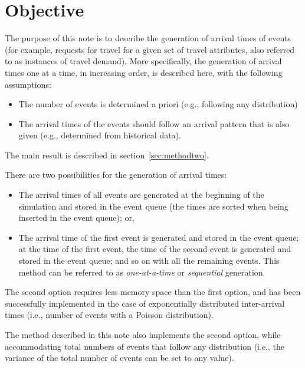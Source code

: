 \documentclass[12pt]{article} %
\begin{document}
\section{Objective}
%
The purpose of this note is to describe the generation of arrival times of events (for example, requests for travel for a given set of travel attributes, also referred to as instances of travel demand). More specifically, the generation of arrival times one at a time, in increasing order, is described here, with the following assumptions:
\begin{itemize}
\item The number of events is determined a priori (e.g., following any distribution)
\item The arrival times of the events should follow an arrival pattern that is also given (e.g., determined from historical data).
\end{itemize}
The main result is described in section~\ref{sec:methodtwo}.\par
There are two possibilities for the generation of arrival times:
\begin{itemize}
\item The arrival times of all events are generated at the beginning of the simulation and stored in the event queue (the times are sorted when being inserted in the event queue); or,
\item The arrival time of the first event is generated and stored in the event queue; at the time of the first event, the time of the second event is generated and stored in the event queue; and so on with all the remaining events. This method can be referred to as {\itshape one-at-a-time} or {\itshape sequential} generation.
\end{itemize}
The second option requires less memory space than the first option, and has been successfully implemented in the case of exponentially distributed inter-arrival times (i.e., number of events with a Poisson distribution).\par
The method described in this note also implements the second option, while accommodating total numbers of events that follow any distribution (i.e., the variance of the total number of events can be set to any value).
%
%
\end{document}
